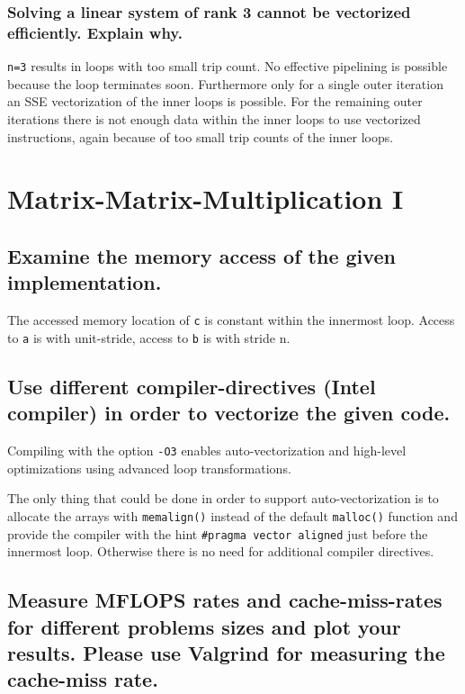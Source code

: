 \documentclass[11pt]{article}
\begin{document}
\subsubsection*{Solving a linear system of rank 3 cannot be vectorized efficiently. Explain why.}

\texttt{n=3} results in loops with too small trip count. No effective pipelining is possible because the loop terminates soon. Furthermore only for a single outer iteration an SSE vectorization of the inner loops is possible. For the remaining outer iterations there is not enough data within the inner loops to use vectorized instructions, again because of too small trip counts of the inner loops.

\section{Matrix-Matrix-Multiplication I}

\subsection*{Examine the memory access of the given implementation.}

The accessed memory location of \texttt{c} is constant within the innermost loop. Access to \texttt{a} is with unit-stride, access to \texttt{b} is with stride n.

\subsection*{Use different compiler-directives (Intel compiler) in order to vectorize the given code.}

Compiling with the option \texttt{-O3} enables auto-vectorization and high-level optimizations using advanced loop transformations.

The only thing that could be done in order to support auto-vectorization is to allocate the arrays with \texttt{memalign()} instead of the default \texttt{malloc()} function and provide the compiler with the hint \texttt{\#pragma vector aligned} just before the innermost loop. Otherwise there is no need for additional compiler directives.

\subsection*{Measure MFLOPS rates and cache-miss-rates for different problems sizes and plot your results. Please use Valgrind for measuring the cache-miss rate.}
\end{document}
